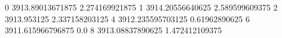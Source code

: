 0 3913.89013671875 2.274169921875
1 3914.20556640625 2.589599609375
2 3913.953125 2.337158203125
4 3912.235595703125 0.61962890625
6 3911.615966796875 0.0
8 3913.08837890625 1.472412109375
